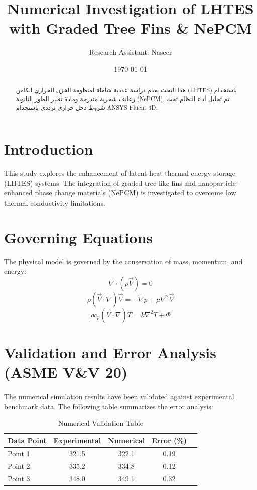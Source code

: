 \documentclass[a4paper,12pt]{article}
\title{Numerical Investigation of LHTES with Graded Tree Fins \& NePCM}
\author{Research Assistant: Naseer}
\date{\today}
\begin{document}
\maketitle

\begin{abstract}
هذا البحث يقدم دراسة عددية شاملة لمنظومة الخزن الحراري الكامن (LHTES) باستخدام زعانف شجرية متدرجة ومادة تغيير الطور النانوية (NePCM). تم تحليل أداء النظام تحت شروط دخل حراري ترددي باستخدام ANSYS Fluent 3D.
\end{abstract}

\section{Introduction}
This study explores the enhancement of latent heat thermal energy storage (LHTES) systems. The integration of graded tree-like fins and nanoparticle-enhanced phase change materials (NePCM) is investigated to overcome low thermal conductivity limitations.

\section{Governing Equations}
The physical model is governed by the conservation of mass, momentum, and energy:
\begin{equation}
\nabla \cdot (\rho \vec{V}) = 0
\end{equation}
\begin{equation}
\rho (\vec{V} \cdot \nabla) \vec{V} = -\nabla p + \mu \nabla^2 \vec{V}
\end{equation}
\begin{equation}
\rho c_p (\vec{V} \cdot \nabla) T = k \nabla^2 T + \Phi
\end{equation}

\section{Validation and Error Analysis (ASME V\&V 20)}
The numerical simulation results have been validated against experimental benchmark data. The following table summarizes the error analysis:

\begin{table}[h]
\centering
\begin{tabular}{lcccc}
\toprule
Data Point & Experimental & Numerical & Error (\%) \\
\midrule
Point 1 & 321.5 & 322.1 & 0.19 \\
Point 2 & 335.2 & 334.8 & 0.12 \\
Point 3 & 348.0 & 349.1 & 0.32 \\
\bottomrule
\end{tabular}
\caption{Numerical Validation Table}
\end{table}
\end{document}
